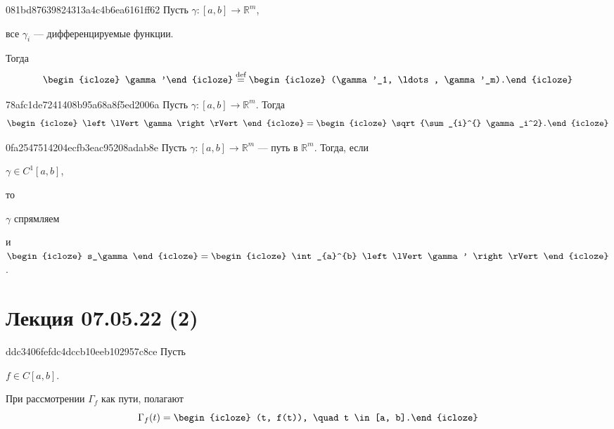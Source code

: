 \begin{note}{081bd87639824313a4c4b6ea6161ff62}
    Пусть \({ \gamma : [a, b] \to \mathbb R^{m} }\),\: \begin{icloze}{3}все \({ \gamma_i }\) --- дифференцируемые функции.\end{icloze}
    Тогда
    \[
        \begin{icloze}{2}\gamma'\end{icloze} \overset{\text{def}}= \begin{icloze}{1}(\gamma'_1, \ldots, \gamma'_m).\end{icloze}
    \]
\end{note}

\begin{note}{78afc1de7241408b95a68a8f5ed2006a}
    Пусть \({ \gamma : [a, b] \to \mathbb R^{m} }\).
    Тогда
    \[
        \begin{icloze}{2}\left\lVert \gamma \right\rVert\end{icloze} = \begin{icloze}{1}\sqrt{\sum_{i}^{} \gamma_i^2}.\end{icloze}
    \]
\end{note}

\begin{note}{0fa2547514204ecfb3eac95208adab8e}
    Пусть \({ \gamma : [a, b] \to \mathbb R^{m} }\) --- путь в \({ \mathbb R^{m} }\).
    Тогда, если \begin{icloze}{4}\({ \gamma \in C^{1}[a, b] }\),\end{icloze} то \begin{icloze}{2}\({ \gamma }\) спрямляем\end{icloze} и
    \({ \begin{icloze}{3}s_\gamma\end{icloze} = \begin{icloze}{1}\int_{a}^{b} \left\lVert \gamma' \right\rVert\end{icloze} }\).
\end{note}

\section{Лекция 07.05.22 (2)}
\begin{note}{ddc3406fefdc4dccb10eeb102957c8ce}
    Пусть \begin{icloze}{2}\({ f \in C[a, b] }\).\end{icloze}
    При рассмотрении \({ \Gamma_f }\) как пути, полагают
    \[
        \Gamma_f (t) = \begin{icloze}{1}(t, f(t)), \quad t \in [a, b].\end{icloze}
    \]
\end{note}

